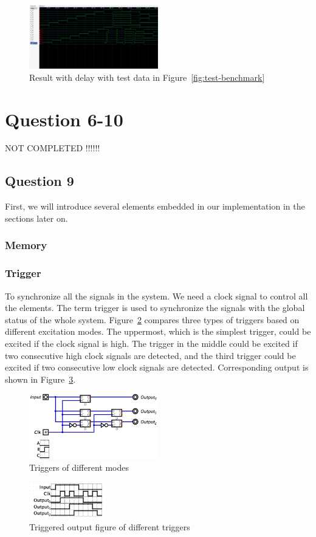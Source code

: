 \documentclass[conference]{IEEEtran}
\begin{document}
\begin{figure}[h!]
    \centering
    \includegraphics[width=0.5\textwidth]{assets/gtkwave.png}
    \caption{Result with delay with test data in Figure~\ref{fig:test-benchmark}}
    \label{fig:result-with-delay}
\end{figure}

\section{Question 6-10}

NOT COMPLETED !!!!!!

\subsection{Question 9}

First, we will introduce several elements embedded in our implementation in the sections later on.

\subsubsection{Memory}

\subsubsection{Trigger}

To synchronize all the signals in the system. We need a clock signal to control all the elements. The term trigger is used to synchronize the signals
with the global status of the whole system. Figure~\ref{fig:triggers} compares three types of triggers based on different excitation modes. The uppermost, which is the simplest trigger, could be excited if
the clock signal is high. The trigger in the middle could be excited if two consecutive high clock signals are detected, and the third trigger could be excited if two consecutive low clock signals are detected. Corresponding output is shown in Figure~\ref{fig:trigger-output}.

\begin{figure}[h!]
    \centering
    \includegraphics[width=0.5\textwidth]{assets/triggers.png}
    \caption{Triggers of different modes}
    \label{fig:triggers}
\end{figure}

\begin{figure}[h!]
    \centering
    \includegraphics[width=0.3\textwidth]{assets/trigger-output.png}
    \caption{Triggered output figure of different triggers}
    \label{fig:trigger-output}
\end{figure}
\end{document}
